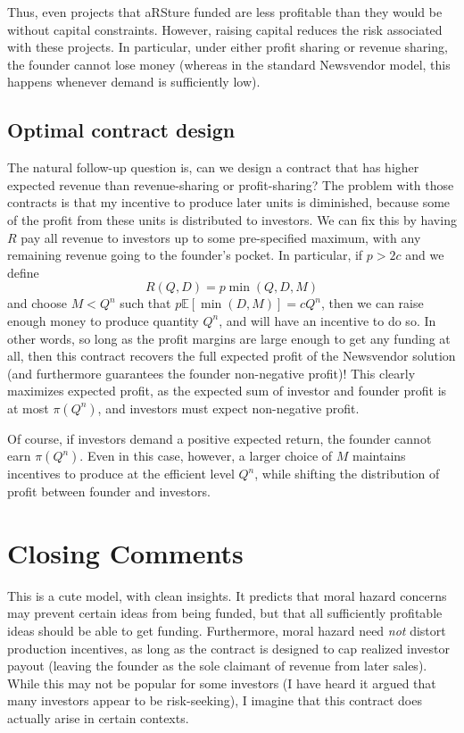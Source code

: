 \documentclass[11pt, oneside]{article}   	%
\newcommand{\E}{\mathbb{E}}
\begin{document}
Thus, even projects that aRSture funded are less profitable than they would be without capital constraints. However, raising capital reduces the risk associated with these projects. In particular, under either profit sharing or revenue sharing, the founder cannot lose money (whereas in the standard Newsvendor model, this happens whenever demand is sufficiently low).

\subsection{Optimal contract design}

The natural follow-up question is, can we design a contract that has higher expected revenue than revenue-sharing or profit-sharing? The problem with those contracts is that my incentive to produce later units is diminished, because some of the profit from these units is distributed to investors. We can fix this by having $R$ pay all revenue to investors up to some pre-specified maximum, with any remaining revenue going to the founder's pocket. In particular, if $p > 2c$ and we define 
\[R(Q,D) = p \min(Q,D,M) \]
and choose $M < Q^n$ such that $p\E[\min(D,M)] = c Q^n$, then we can raise enough money to produce quantity $Q^n$, and will have an incentive to do so. In other words, so long as the profit margins are large enough to get any funding at all, then this contract recovers the full expected profit of the Newsvendor solution (and furthermore guarantees the founder non-negative profit)! This clearly maximizes expected profit, as the expected sum of investor and founder profit is at most $\pi(Q^n)$, and investors must expect non-negative profit.

Of course, if investors demand a positive expected return, the founder cannot earn $\pi(Q^n)$. Even in this case, however, a larger choice of $M$ maintains incentives to produce at the efficient level $Q^n$, while shifting the distribution of profit between founder and investors.

\newpage
\section{Closing Comments}

This is a cute model, with clean insights. It predicts that moral hazard concerns may prevent certain ideas from being funded, but that all sufficiently profitable ideas should be able to get funding. Furthermore, moral hazard need {\em not} distort production incentives, as long as the contract is designed to cap realized investor payout (leaving the founder as the sole claimant of revenue from later sales). While this may not be popular for some investors (I have heard it argued that many investors appear to be risk-seeking), I imagine that this contract does actually arise in certain contexts.
\end{document}
